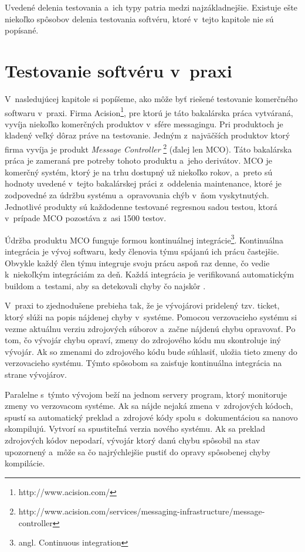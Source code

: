 Uvedené delenia testovania a~ich typy patria medzi najzákladnejšie. 
Existuje ešte niekoľko spôsobov delenia testovania softvéru, ktoré v~tejto kapitole nie sú popísané.

\section{Testovanie softvéru v~praxi} \label{sekcia:testovanie_v_praxi}
V~nasledujúcej kapitole si popíšeme, ako môže byť riešené testovanie komerčného softwaru v~praxi.
Firma Acision\footnote{http://www.acision.com/}, pre ktorú je táto bakalárska práca vytváraná, vyvíja niekoľko komerčných produktov
v~sfére messagingu. Pri produktoch je kladený veľký dôraz práve na testovanie.
Jedným z~najväčších produktov ktorý firma vyvíja je produkt {\it Message Controller}
\footnote{http://www.acision.com/services/messaging-infrastructure/message-controller} (ďalej len MCO).
Táto bakalárska práca je zameraná pre potreby tohoto produktu a~jeho derivátov.
MCO je komerčný systém, ktorý je na trhu dostupný už niekoľko rokov, a~preto sú hodnoty uvedené v~tejto 
bakalárskej práci z~oddelenia maintenance, ktoré je zodpovedné za údržbu systému a~opravovania chýb v~ňom vyskytnutých.
Jednotlivé produkty sú každodenne testované regresnou sadou testou, ktorá v~prípade MCO pozostáva z~asi 1500 testov.

Údržba produktu MCO funguje formou kontinuálnej integrácie\footnote{angl. Continuous integration}.
Kontinuálna integrácia je vývoj softwaru, kedy členovia týmu spájanú ich prácu častejšie.
Obvykle každý člen týmu integruje svoju prácu aspoň raz denne, čo vedie k~niekoľkým integráciám za deň.
Každá integrácia je verifikovaná automatickým buildom a~testami, aby sa detekovali chyby čo najskôr \cite{Continuous_integration}.

V~praxi to zjednodušene prebieha tak, že je vývojárovi pridelený tzv. ticket, ktorý slúži na popis
nájdenej chyby v~systéme. Pomocou verzovacieho systému si vezme aktuálnu verziu zdrojových súborov a~začne nájdenú chybu opravovať.
Po tom, čo vývojár chybu opraví, zmeny do zdrojového kódu mu skontroluje iný vývojár.
Ak so zmenami do zdrojového kódu bude súhlasiť, uložia tieto zmeny do verzovacieho systému.
Týmto spôsobom sa zaisťuje kontinuálna integrácia na strane vývojárov.

Paralelne s~týmto vývojom beží na jednom servery program, ktorý monitoruje zmeny vo verzovacom systéme.
Ak sa nájde nejaká zmena v~zdrojových kódoch, spustí sa automatický preklad a~zdrojové kódy spolu s~dokumentáciou
sa nanovo skompilujú. Vytvorí sa spustiteľná verzia nového systému. Ak sa preklad zdrojových kódov nepodarí, vývojár ktorý 
danú chybu spôsobil na stav upozornený a~môže sa čo najrýchlejšie pustiť do opravy spôsobenej chyby kompilácie.

